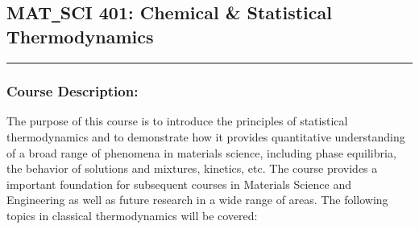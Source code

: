 	\subsection{MAT\texttt{\_}SCI 401: Chemical \& Statistical Thermodynamics}
	\vspace{-1em} \hfill \rule{0.4\textwidth}{.4pt}\newline
	\null \hfill {} \newline
	\null \hfill {}
\normalfont
		\subsubsection*{Course Description:}
	The purpose of this course is to introduce the principles of statistical thermodynamics and to demonstrate how it provides quantitative understanding of a broad range of phenomena in materials science, including phase equilibria, the behavior of solutions and mixtures, kinetics, etc. The course provides a important foundation for subsequent courses in Materials Science and Engineering as well as future research in a wide range of areas. The following topics in classical thermodynamics will be covered:
